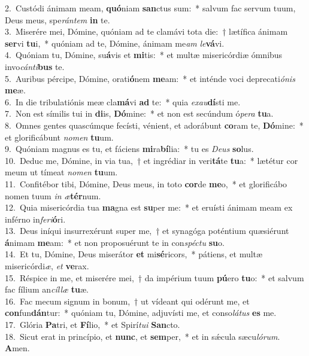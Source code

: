 {2.~}Custódi ánimam meam, \textbf{quó}niam \textbf{san}ctus sum:~* salvum fac servum tuum, Deus meus, spe\textit{rán}\textit{tem} \textbf{in} te.\\
{3.~}Miserére mei, Dómine, quóniam ad te clamávi tota die:~† lætífica ánimam \textbf{ser}vi \textbf{tu}i,~* quóniam ad te, Dómine, ánimam me\textit{am} \textit{le}\textbf{vá}vi.\\
{4.~}Quóniam tu, Dómine, su\textbf{á}vis et \textbf{mi}tis:~* et multæ misericórdiæ ómnibus invo\textit{cán}\textit{ti}\textbf{bus} te.\\
{5.~}Auribus pércipe, Dómine, orati\textbf{ó}nem \textbf{me}am:~* et inténde voci deprecati\textit{ó}\textit{nis} \textbf{me}æ.\\
{6.~}In die tribulatiónis meæ cla\textbf{má}vi \textbf{ad} te:~* quia \textit{e}\textit{xau}\textbf{dí}sti me.\\
{7.~}Non est símilis tui in \textbf{di}is, \textbf{Dó}mine:~* et non est secúndum ó\textit{pe}\textit{ra} \textbf{tu}a.\\
{8.~}Omnes gentes quascúmque fecísti, vénient, et adorábunt \textbf{co}ram te, \textbf{Dó}mine:~* et glorificábunt \textit{no}\textit{men} \textbf{tu}um.\\
{9.~}Quóniam magnus es tu, et fáciens \textbf{mi}ra\textbf{bí}lia:~* tu es \textit{De}\textit{us} \textbf{so}lus.\\
{10.~}Deduc me, Dómine, in via tua,~† et ingrédiar in veri\textbf{tá}te \textbf{tu}a:~* lætétur cor meum ut tímeat \textit{no}\textit{men} \textbf{tu}um.\\
{11.~}Confitébor tibi, Dómine, Deus meus, in toto \textbf{cor}de \textbf{me}o,~* et glorificábo nomen tuum \textit{in} \textit{æ}\textbf{tér}num.\\
{12.~}Quia misericórdia tua \textbf{ma}gna est \textbf{su}per me:~* et eruísti ánimam meam ex inférno in\textit{fe}\textit{ri}\textbf{ó}ri.\\
{13.~}Deus iníqui insurrexérunt super me,~† et synagóga poténtium quæsiérunt \textbf{á}nimam \textbf{me}am:~* et non proposuérunt te in con\textit{spé}\textit{ctu} \textbf{su}o.\\
{14.~}Et tu, Dómine, Deus miserátor \textbf{et} mi\textbf{sé}ricors,~* pátiens, et multæ misericórdi\textit{æ}, \textit{et} \textbf{ve}rax.\\
{15.~}Réspice in me, et miserére mei,~† da impérium tuum \textbf{pú}ero \textbf{tu}o:~* et salvum fac fílium an\textit{cíl}\textit{læ} \textbf{tu}æ.\\
{16.~}Fac mecum signum in bonum,~† ut vídeant qui odérunt me, et \textbf{con}fun\textbf{dán}tur:~* quóniam tu, Dómine, adjuvísti me, et conso\textit{lá}\textit{tus} \textbf{es} me.\\
{17.~}Glória \textbf{Pa}tri, et \textbf{Fí}lio,~* et Spirí\textit{tu}\textit{i} \textbf{San}cto.\\
{18.~}Sicut erat in princípio, et \textbf{nunc}, et \textbf{sem}per,~* et in sǽcula sæcu\textit{ló}\textit{rum}. \textbf{A}men.\\
